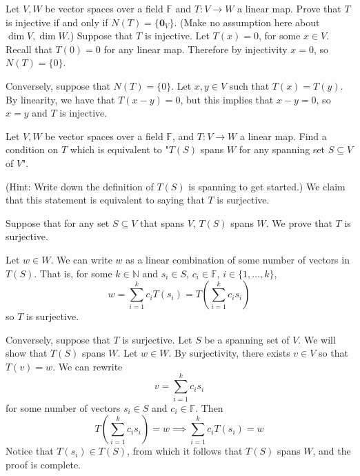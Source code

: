 \documentclass{eh-homework}
\begin{document}
    \begin{question}{6}
        Let \( V, W \) be vector spaces over a field \( \mathbb{F} \) and \( T : V \to W \) a linear map. Prove that \( T \) is injective if and only if \( N(T) = \{\mathbf{0}_V\} \). (Make no assumption here about \( \dim V, \dim W \).)
        \tcblower
        Suppose that \(T\) is injective. Let \(T(x) = 0\), for some \(x \in V\). Recall that \(T(0) = 0\) for any linear map. Therefore by injectivity \(x = 0\), so \(N(T) = \{ 0 \}\).

        Conversely, suppose that \(N(T) = \{ 0 \}\). Let \(x,y \in V\) such that \(T(x) = T(y)\). By linearity, we have that \(T(x - y) = 0\), but this implies that \(x - y = 0\), so \(x = y\) and \(T\) is injective.
    \end{question}

    \begin{question}{7}
        Let \( V, W \) be vector spaces over a field \( \mathbb{F} \), and \( T : V \to W \) a linear map. Find a condition on \( T \) which is equivalent to "\( T(S) \) spans \( W \) for any spanning set \( S \subseteq V \) of \( V \)".

        (Hint: Write down the definition of \( T(S) \) is spanning to get started.)
        \tcblower
        We claim that this statement is equivalent to saying that \(T\) is surjective.

        Suppose that for any set \(S \subseteq V\) that spans \(V\), \(T(S)\) spans \(W\). We prove that \(T\) is surjective.

        Let \(w \in W\). We can write \(w\) as a linear combination of some number of vectors in \(T(S)\). That is, for some \(k \in \mathbb{N}\) and \(s_i \in S\), \(c_i \in \mathbb{F}\), \(i \in \{ 1, ..., k \}\),
        \[
            w = \sum_{i=1}^{k} c_i T(s_i) = T \left(\sum_{i=1}^{k}c_i s_i\right)
        \]
        so \(T\) is surjective.

        Conversely, suppose that \(T\) is surjective. Let \(S\) be a spanning set of \(V\). We will show that \(T(S)\) spans \(W\). Let \(w \in W\). By surjectivity, there exists \(v \in V\) so that \(T(v) = w\). We can rewrite
        \[
            v = \sum_{i=1}^{k} c_i s_i
        \]
        for some number of vectors \(s_i \in S\) and \(c_i \in \mathbb{F}\). Then
        \[
            T\left( \sum_{i=1}^{k} c_i s_i \right) = w \implies \sum_{i=1}^{k} c_i T(s_i) = w
        \]
        Notice that \(T(s_i) \in T(S)\), from which it follows that \(T(S)\) spans \(W\), and the proof is complete.
    \end{question}
\end{document}
